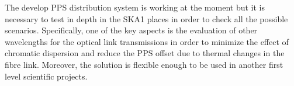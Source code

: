 The develop PPS distribution system is working at the moment but it is 
necessary to test in depth in the SKA1 places in order to check all the 
possible scenarios. Specifically, one of the key aspects is the evaluation of 
other wavelengths for the optical link transmissions in order to minimize the 
effect of chromatic dispersion and reduce the PPS offset due to thermal changes 
in the fibre link. Moreover, the solution is flexible enough to be used in 
another first level scientific projects. 
